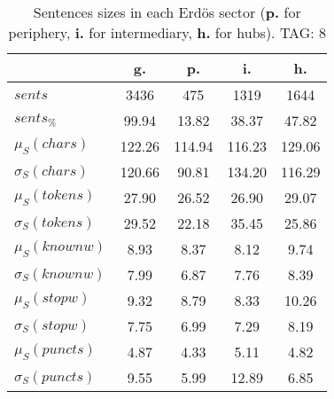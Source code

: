 \begin{table}[h!]
\begin{center}
\begin{tabular}{| l || c | c | c | c |}\hline
 & {\bf g.} & {\bf p.} & {\bf i.} & {\bf h.} \\\hline\hline
$sents$ & 3436  & 475  & 1319  & 1644 \\
$sents_{\%}$ & 99.94  & 13.82  & 38.37  & 47.82 \\\hline
$\mu_S(chars)$ & 122.26  & 114.94  & 116.23  & 129.06 \\
$\sigma_S(chars)$ & 120.66  & 90.81  & 134.20  & 116.29 \\\hline
$\mu_S(tokens)$ & 27.90  & 26.52  & 26.90  & 29.07 \\
$\sigma_S(tokens)$ & 29.52  & 22.18  & 35.45  & 25.86 \\\hline
$\mu_S(knownw)$ & 8.93  & 8.37  & 8.12  & 9.74 \\
$\sigma_S(knownw)$ & 7.99  & 6.87  & 7.76  & 8.39 \\\hline
$\mu_S(stopw)$ & 9.32  & 8.79  & 8.33  & 10.26 \\
$\sigma_S(stopw)$ & 7.75  & 6.99  & 7.29  & 8.19 \\\hline
$\mu_S(puncts)$ & 4.87  & 4.33  & 5.11  & 4.82 \\
$\sigma_S(puncts)$ & 9.55  & 5.99  & 12.89  & 6.85 \\\hline
\end{tabular}
\caption{Sentences sizes in each Erd\"os sector ({{\bf p.}} for periphery, {{\bf i.}} for intermediary, {{\bf h.}} for hubs). TAG: 8}
\end{center}
\end{table}